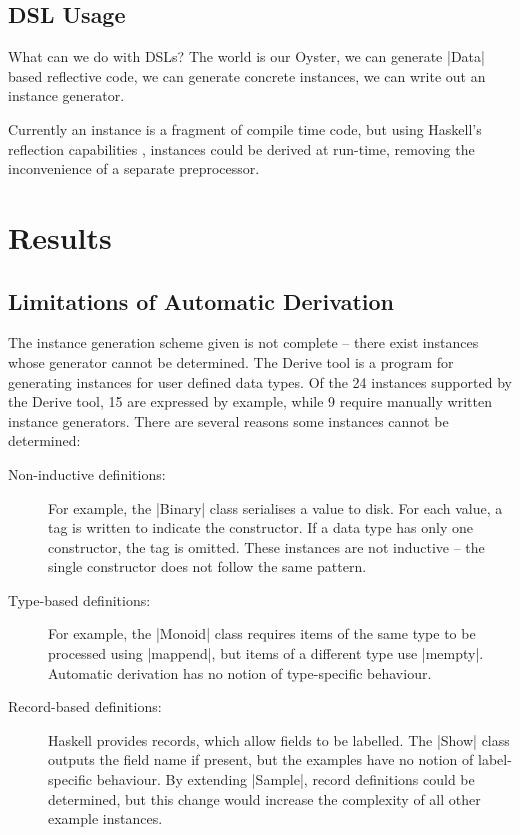 \documentclass[preprint,draft]{sigplanconf}
\begin{document}
\subsection{DSL Usage}

What can we do with DSLs? The world is our Oyster, we can generate |Data| based reflective code, we can generate concrete instances, we can write out an instance generator.

Currently an instance is a fragment of compile time code, but using Haskell's reflection capabilities \cite{lammel:syb2}, instances could be derived at run-time, removing the inconvenience of a separate preprocessor.

\section{Results}
\label{sec:results}

\subsection{Limitations of Automatic Derivation}
\label{sec:failure}

The instance generation scheme given is not complete -- there exist instances whose generator cannot be determined. The Derive tool \cite{derive} is a program for generating instances for user defined data types. Of the 24 instances supported by the Derive tool, 15 are expressed by example, while 9 require manually written instance generators. There are several reasons some instances cannot be determined:

\begin{description}

\item[Non-inductive definitions:] For example, the |Binary| class serialises a value to disk. For each value, a tag is written to indicate the constructor. If a data type has only one constructor, the tag is omitted. These instances are not inductive -- the single constructor does not follow the same pattern.

\item[Type-based definitions:] For example, the |Monoid| class requires items of the same type to be processed using |mappend|, but items of a different type use |mempty|. Automatic derivation has no notion of type-specific behaviour.

\item [Record-based definitions:] Haskell provides records, which allow fields to be labelled. The |Show| class outputs the field name if present, but the examples have no notion of label-specific behaviour. By extending |Sample|, record definitions could be determined, but this change would increase the complexity of all other example instances.

\end{description}
\end{document}
